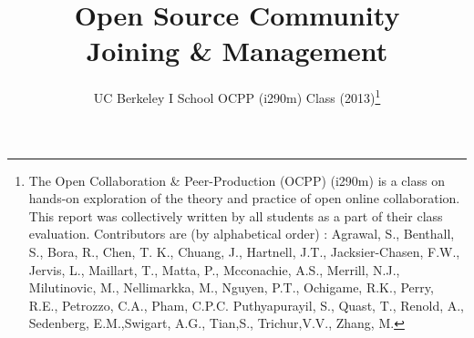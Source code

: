 \documentclass[runningheads,a4paper]{llncs}
\begin{document}
\mainmatter  %

\title{Open Source Community \\ Joining \& Management\\}


%
%
\author{UC Berkeley I School OCPP (i290m) Class (2013)\footnote{The Open Collaboration \& Peer-Production (OCPP) (i290m) is a class on hands-on exploration of the theory and practice of open online collaboration. This report was collectively written by all students as a part of their class evaluation. Contributors are (by alphabetical order) : Agrawal, S., Benthall, S., Bora, R., Chen, T. K., Chuang, J., Hartnell, J.T., Jacksier-Chasen, F.W., Jervis, L., Maillart, T., Matta, P.,  Mcconachie, A.S., Merrill, N.J., Milutinovic, M., Nellimarkka, M., 
Nguyen, P.T., Ochigame, R.K., Perry, R.E., Petrozzo, C.A., Pham, C.P.C.
Puthyapurayil, S., Quast, T., Renold, A.,  Sedenberg, E.M.,Swigart, A.G., Tian,S., Trichur,V.V., Zhang, M.}}


%
%
%
\end{document}
